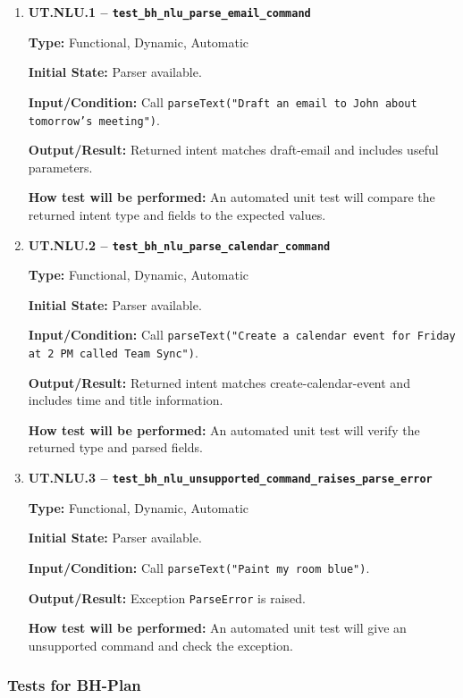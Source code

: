 \documentclass[12pt, titlepage]{article}
\begin{document}
\begin{enumerate}

\item \textbf{UT.NLU.1 --
\texttt{test\_bh\_nlu\_parse\_email\_command}}

\textbf{Type:} Functional, Dynamic, Automatic

\textbf{Initial State:} Parser available.

\textbf{Input/Condition:} Call \texttt{parseText("Draft an email to John about
tomorrow's meeting")}.

\textbf{Output/Result:} Returned intent matches draft-email and includes useful
parameters.

\textbf{How test will be performed:} An automated unit test will compare the
returned intent type and fields to the expected values.

\item \textbf{UT.NLU.2 --
\texttt{test\_bh\_nlu\_parse\_calendar\_command}}

\textbf{Type:} Functional, Dynamic, Automatic

\textbf{Initial State:} Parser available.

\textbf{Input/Condition:} Call \texttt{parseText("Create a calendar event for
Friday at 2 PM called Team Sync")}.

\textbf{Output/Result:} Returned intent matches create-calendar-event and
includes time and title information.

\textbf{How test will be performed:} An automated unit test will verify the
returned type and parsed fields.

\item \textbf{UT.NLU.3 --
\texttt{test\_bh\_nlu\_unsupported\_command\_raises\_parse\_error}}

\textbf{Type:} Functional, Dynamic, Automatic

\textbf{Initial State:} Parser available.

\textbf{Input/Condition:} Call \texttt{parseText("Paint my room blue")}.

\textbf{Output/Result:} Exception \texttt{ParseError} is raised.

\textbf{How test will be performed:} An automated unit test will give an
unsupported command and check the exception.

\end{enumerate}

\subsubsection{Tests for BH-Plan}
\end{document}
